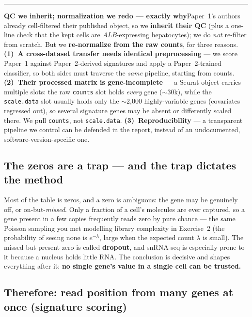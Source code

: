 \documentclass[11pt]{article}
\newcommand{\aside}[2]{\par\medskip\noindent\textcolor{teal0}{\rule{2pt}{\baselineskip}}\quad\textbf{\textcolor{teal0}{#1}}\quad #2\par\medskip}
\newcommand{\gene}[1]{\textit{#1}}
\newcommand{\code}[1]{\texttt{#1}}
\begin{document}
\aside{QC we inherit; normalization we redo --- exactly why}{Paper~1's authors already cell-filtered
their published object, so we \textbf{inherit their QC} (plus a one-line check that the kept cells are
\gene{ALB}-expressing hepatocytes); we do \emph{not} re-filter from scratch. But we \textbf{re-normalize
from the raw counts}, for three reasons. \textbf{(1)~A cross-dataset transfer needs identical
preprocessing} --- we score Paper~1 against Paper~2-derived signatures and apply a Paper~2-trained
classifier, so both sides must traverse the \emph{same} pipeline, starting from counts.
\textbf{(2)~Their processed matrix is gene-incomplete} --- a Seurat object carries multiple slots: the
raw \code{counts} slot holds \emph{every} gene ($\sim$30k), while the \code{scale.data} slot usually
holds only the $\sim$2{,}000 highly-variable genes (covariates regressed out), so several signature
genes may be absent or differently scaled there. We pull \code{counts}, not \code{scale.data}.
\textbf{(3)~Reproducibility} --- a transparent pipeline we control can be defended in the report,
instead of an undocumented, software-version-specific one.}

\subsection{The zeros are a trap --- and the trap dictates the method}

Most of the table is zeros, and a zero is ambiguous: the gene may be genuinely off, or
on-but-\emph{missed}. Only a fraction of a cell's molecules are ever captured, so a gene present in a
few copies frequently reads zero by pure chance --- the same Poisson sampling you met modelling library
complexity in Exercise~2 (the probability of seeing none is $e^{-\lambda}$, large when the expected
count $\lambda$ is small). The missed-but-present zero is called \textbf{dropout}, and snRNA-seq is
especially prone to it because a nucleus holds little RNA. The conclusion is decisive and shapes
everything after it: \textbf{no single gene's value in a single cell can be trusted.}

\subsection{Therefore: read position from many genes at once (signature scoring)}
\label{sec:scoring}
\end{document}
